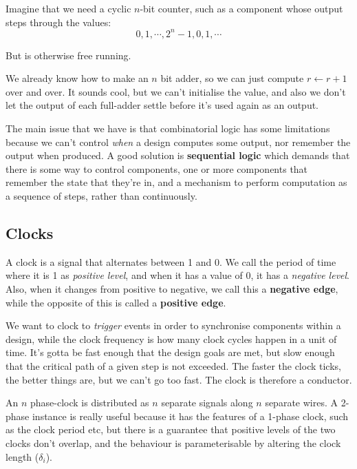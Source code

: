 \documentclass[11pt,a4paper,titlepage,dvipsnames,cmyk]{scrartcl}
\begin{document}
Imagine that we need a cyclic $n$-bit counter, such as a component whose
output steps through the values:
\begin{equation*}
    0,1,\cdots,2^n -1, 0,1,\cdots
\end{equation*}

But is otherwise free running.

We already know how to make an $n$ bit adder, so we can just compute $r
\leftarrow r + 1$ over and over. It sounds cool, but we can't initialise the
value, and also we don't let the output of each full-adder settle before
it's used again as an output. 

The main issue that we have is that combinatorial logic has some
limitations because we can't control \textit{when} a design computes some
output, nor remember the output when produced. A good solution is
\textbf{sequential logic} which demands that there is some way to control
components, one or more components that remember the state that they're
in, and a mechanism to perform computation as a sequence of steps, rather
than continuously.

\subsection{Clocks}%
\label{sub:Clocks}

A clock is a signal that alternates between 1 and 0. We call the period of
time where it is 1 as \textit{positive level}, and when it has a value of
0, it has a \textit{negative level}. Also, when it changes from positive
to negative, we call this a \textbf{negative edge}, while the opposite of
this is called a \textbf{positive edge}.

We want to clock to \textit{trigger} events in order to synchronise
components within a design, while the clock frequency is how many clock
cycles happen in a unit of time. It's gotta be fast enough that the design
goals are met, but slow enough that the critical path of a given step is
not exceeded. The faster the clock ticks, the better things are, but we
can't go too fast. The clock is therefore a conductor.

An $n$ phase-clock is distributed as $n$ separate signals along $n$
separate wires. A 2-phase instance is really useful because it has the
features of a 1-phase clock, such as the clock period etc, but there is a
guarantee that positive levels of the two clocks don't overlap, and the
behaviour is parameterisable by altering the clock length ($\delta_i$).
\end{document}
